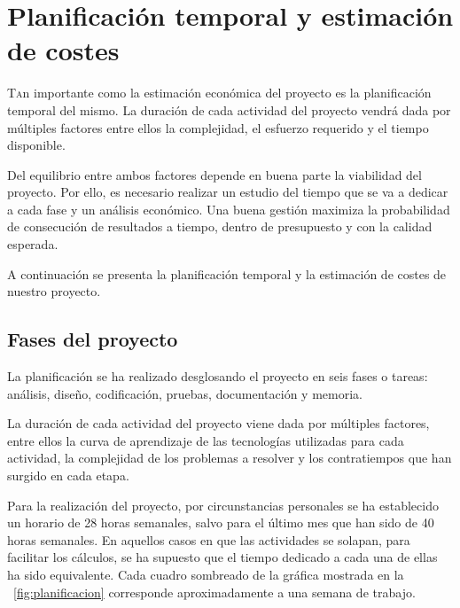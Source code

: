 \chapter{Planificación temporal y estimación de costes}
\label{chap:planificacion}

\lettrine{T}{a}n importante como la estimación económica del proyecto es la planificación temporal del mismo. La duración de cada actividad del proyecto vendrá dada por múltiples factores entre ellos la complejidad, el esfuerzo requerido y el tiempo disponible.

Del equilibrio entre ambos factores depende en buena parte la viabilidad del
proyecto. Por ello, es necesario realizar un estudio del tiempo que se va a dedicar a cada fase y un análisis económico. Una buena gestión maximiza la probabilidad de consecución de resultados a tiempo, dentro de presupuesto y con la calidad esperada.

A continuación se presenta la planificación temporal y la estimación de costes de nuestro proyecto.

\section{Fases del proyecto} 

La planificación se ha realizado desglosando el proyecto en seis fases o tareas: análisis, diseño, codificación, pruebas, documentación y memoria. 

La duración de cada actividad del proyecto viene dada por múltiples factores, entre ellos la curva de aprendizaje de las tecnologías utilizadas para cada actividad, la complejidad de los problemas a resolver y los contratiempos que han surgido en cada etapa.

Para la realización del proyecto, por circunstancias personales se ha establecido un horario de 28 horas semanales, salvo para el último mes que han sido de 40 horas semanales. En aquellos casos en que las actividades se solapan, para facilitar los cálculos, se ha supuesto que el tiempo dedicado a cada una de ellas ha sido equivalente. Cada cuadro sombreado de la gráfica mostrada en la \figurename~\ref{fig:planificacion} corresponde aproximadamente a una semana de trabajo.



